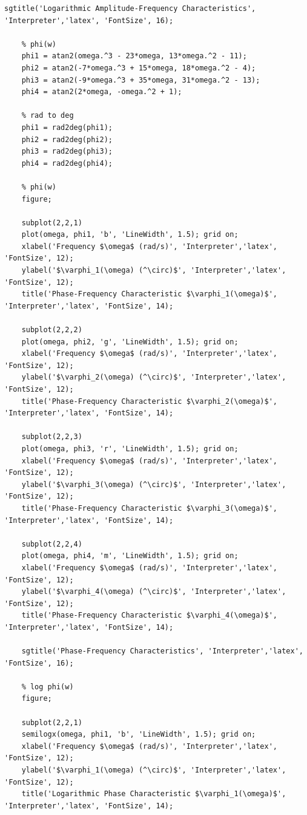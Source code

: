 \documentclass[a4paper, 12pt]{article}
\begin{document}
\begin{lstlisting}[label=task1, caption={Программа для задания 1}]
    sgtitle('Logarithmic Amplitude-Frequency Characteristics', 'Interpreter','latex', 'FontSize', 16);

    % phi(w)
    phi1 = atan2(omega.^3 - 23*omega, 13*omega.^2 - 11);
    phi2 = atan2(-7*omega.^3 + 15*omega, 18*omega.^2 - 4);
    phi3 = atan2(-9*omega.^3 + 35*omega, 31*omega.^2 - 13);
    phi4 = atan2(2*omega, -omega.^2 + 1);

    % rad to deg
    phi1 = rad2deg(phi1);
    phi2 = rad2deg(phi2);
    phi3 = rad2deg(phi3);
    phi4 = rad2deg(phi4);

    % phi(w)
    figure;

    subplot(2,2,1)
    plot(omega, phi1, 'b', 'LineWidth', 1.5); grid on;
    xlabel('Frequency $\omega$ (rad/s)', 'Interpreter','latex', 'FontSize', 12);
    ylabel('$\varphi_1(\omega) (^\circ)$', 'Interpreter','latex', 'FontSize', 12);
    title('Phase-Frequency Characteristic $\varphi_1(\omega)$', 'Interpreter','latex', 'FontSize', 14);

    subplot(2,2,2)
    plot(omega, phi2, 'g', 'LineWidth', 1.5); grid on;
    xlabel('Frequency $\omega$ (rad/s)', 'Interpreter','latex', 'FontSize', 12);
    ylabel('$\varphi_2(\omega) (^\circ)$', 'Interpreter','latex', 'FontSize', 12);
    title('Phase-Frequency Characteristic $\varphi_2(\omega)$', 'Interpreter','latex', 'FontSize', 14);

    subplot(2,2,3)
    plot(omega, phi3, 'r', 'LineWidth', 1.5); grid on;
    xlabel('Frequency $\omega$ (rad/s)', 'Interpreter','latex', 'FontSize', 12);
    ylabel('$\varphi_3(\omega) (^\circ)$', 'Interpreter','latex', 'FontSize', 12);
    title('Phase-Frequency Characteristic $\varphi_3(\omega)$', 'Interpreter','latex', 'FontSize', 14);

    subplot(2,2,4)
    plot(omega, phi4, 'm', 'LineWidth', 1.5); grid on;
    xlabel('Frequency $\omega$ (rad/s)', 'Interpreter','latex', 'FontSize', 12);
    ylabel('$\varphi_4(\omega) (^\circ)$', 'Interpreter','latex', 'FontSize', 12);
    title('Phase-Frequency Characteristic $\varphi_4(\omega)$', 'Interpreter','latex', 'FontSize', 14);

    sgtitle('Phase-Frequency Characteristics', 'Interpreter','latex', 'FontSize', 16);

    % log phi(w)
    figure;

    subplot(2,2,1)
    semilogx(omega, phi1, 'b', 'LineWidth', 1.5); grid on;
    xlabel('Frequency $\omega$ (rad/s)', 'Interpreter','latex', 'FontSize', 12);
    ylabel('$\varphi_1(\omega) (^\circ)$', 'Interpreter','latex', 'FontSize', 12);
    title('Logarithmic Phase Characteristic $\varphi_1(\omega)$', 'Interpreter','latex', 'FontSize', 14);


\end{lstlisting}
\end{document}
